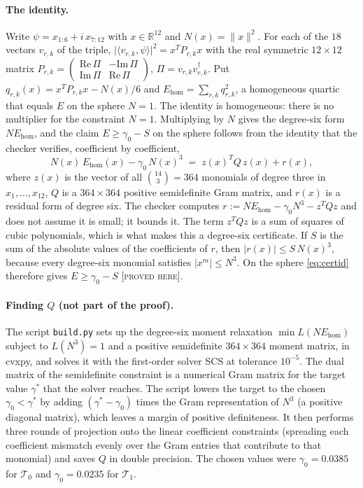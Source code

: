 \documentclass[11pt]{article}
\newcommand{\R}{\mathbb{R}}
\newcommand{\ip}[2]{\langle #1,#2\rangle}
\newcommand{\abs}[1]{\lvert #1\rvert}
\newcommand{\norm}[1]{\lVert #1\rVert}
\newcommand{\Tz}{\mathcal{T}_0}          %
\newcommand{\To}{\mathcal{T}_1}          %
\newcommand{\E}{E}                       %
\newcommand{\st}[1]{\textsc{[#1]}}
\newcommand{\stproved}{\st{proved here}}
\theoremstyle{definition}
\theoremstyle{remark}
\begin{document}
\paragraph{The identity.} Write $\psi=x_{1:6}+i\,x_{7:12}$ with $x\in\R^{12}$ and $N(x)=\norm{x}^2$. For each of the
$18$ vectors $v_{r,k}$ of the triple, $\abs{\ip{v_{r,k}}{\psi}}^2=x^{T}P_{r,k}x$ with the real symmetric
$12\times12$ matrix $P_{r,k}=\begin{pmatrix}\mathrm{Re}\,\Pi&-\mathrm{Im}\,\Pi\\ \mathrm{Im}\,\Pi&\mathrm{Re}\,\Pi\end{pmatrix}$,
$\Pi=v_{r,k}v_{r,k}^{\dagger}$. Put $q_{r,k}(x)=x^{T}P_{r,k}x-N(x)/6$ and
$\E_{\mathrm{hom}}=\sum_{r,k}q_{r,k}^2$, a homogeneous quartic that equals $\E$ on the sphere $N=1$. The identity is homogeneous: there is no multiplier for the
constraint $N=1$. Multiplying by $N$ gives the degree-six form $N\E_{\mathrm{hom}}$, and the claim
$\E\ge\gamma_0-S$ on the sphere follows from the identity that the checker verifies, coefficient by coefficient,
\begin{equation}\label{eq:certid}
  N(x)\,\E_{\mathrm{hom}}(x)-\gamma_0\,N(x)^3 \;=\; z(x)^{T}Q\,z(x)+r(x),
\end{equation}
where $z(x)$ is the vector of all $\binom{14}{3}=364$ monomials of degree three in $x_1,\dots,x_{12}$, $Q$ is a
$364\times364$ positive semidefinite Gram matrix, and $r(x)$ is a residual form of degree six. The checker computes
$r:=N\E_{\mathrm{hom}}-\gamma_0N^3-z^{T}Qz$ and does not assume it is small; it bounds it. The term
$z^{T}Qz$ is a sum of squares of cubic polynomials, which is what makes this a degree-six certificate. If $S$ is the
sum of the absolute values of the coefficients of $r$, then $\abs{r(x)}\le S\,N(x)^3$, because every degree-six
monomial satisfies $\abs{x^m}\le N^3$. On the sphere \eqref{eq:certid} therefore gives $\E\ge\gamma_0-S$
\stproved.

\paragraph{Finding $Q$ (not part of the proof).} The script \texttt{build.py} sets up the degree-six moment
relaxation $\min L(N\E_{\mathrm{hom}})$ subject to $L(N^3)=1$ and a positive semidefinite $364\times364$ moment matrix,
in cvxpy, and solves it with the first-order solver SCS at tolerance $10^{-5}$. The dual matrix of the
semidefinite constraint is a numerical Gram matrix for the target value $\gamma^\ast$ that the solver reaches. The
script lowers the target to the chosen $\gamma_0<\gamma^\ast$ by adding $(\gamma^\ast-\gamma_0)$ times the Gram
representation of $N^3$ (a positive diagonal matrix), which leaves a margin of positive definiteness. It then
performs three rounds of projection onto the linear coefficient constraints (spreading each coefficient mismatch
evenly over the Gram entries that contribute to that monomial) and saves $Q$ in double precision. The chosen values
were $\gamma_0=0.0385$ for $\Tz$ and $\gamma_0=0.0235$ for $\To$.
\end{document}
